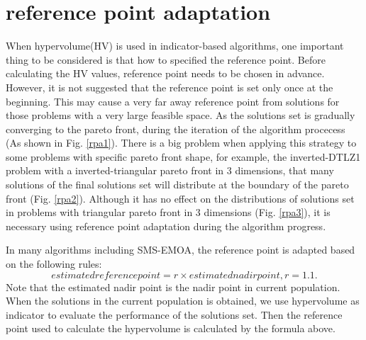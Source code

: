 \documentclass[conference]{IEEEtran}
\begin{document}
\section{reference point adaptation}
When hypervolume(HV) is used in indicator-based algorithms, 
one important thing to be considered is that how to specified the reference point.
Before calculating the HV values, reference point needs to be chosen in advance.
However, it is not suggested that the reference point is set only once at the beginning.
\cite{ut}  %
This may cause a very far away reference point from solutions
for those problems with a very large feasible space. 
As the solutions set is gradually converging to the pareto front, 
during the iteration of the algorithm procecess
(As shown in Fig. \ref{rpa1}).
There is a big problem when applying this strategy to some problems with specific pareto front shape, 
for example, the inverted-DTLZ1 problem with a inverted-triangular pareto front in 3 dimensions,
that many solutions of the final solutions set will distribute at the boundary of the pareto front
(Fig. \ref{rpa2})\cite{hisao1,hisao2}. 
Although it has no effect on the distributions of solutions set 
in problems with triangular pareto front in 3 dimensions (Fig. \ref{rpa3}), 
it is necessary using reference point adaptation during the algorithm progress.

In many algorithms including SMS-EMOA\cite{smsemoa}, 
the reference point is adapted based on the following rules:
\begin{equation}\label{rpaf1}
  estimated reference point = r × estimated nadir point, r = 1.1.
\end{equation}
Note that the estimated nadir point is the nadir point in current population.
When the solutions in the current population is obtained, 
we use hypervolume as indicator to evaluate the performance of the solutions set. 
Then the reference point used to calculate the hypervolume is calculated by the formula above.
\end{document}
